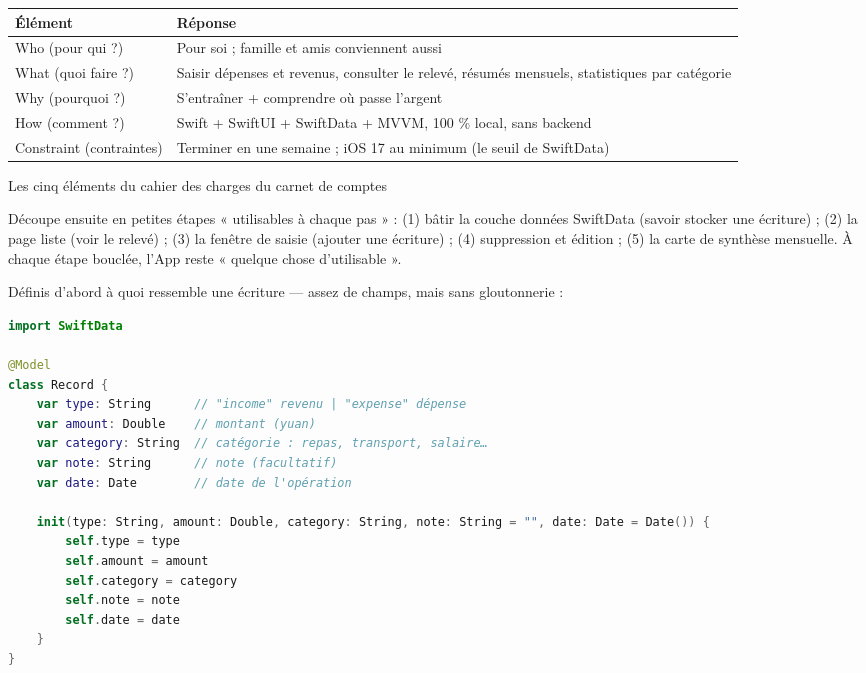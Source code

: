 


\begin{center}
\begin{tabularx}{\linewidth}{|X|X|}
\hline
\textbf{Élément} & \textbf{Réponse} \tabularnewline
\hline
Who (pour qui ?) & Pour soi ; famille et amis conviennent aussi \tabularnewline
What (quoi faire ?) & Saisir dépenses et revenus, consulter le relevé, résumés mensuels, statistiques par catégorie \tabularnewline
Why (pourquoi ?) & S'entraîner + comprendre où passe l'argent \tabularnewline
How (comment ?) & Swift + SwiftUI + SwiftData + MVVM, 100 \% local, sans backend \tabularnewline
Constraint (contraintes) & Terminer en une semaine ; iOS 17 au minimum (le seuil de SwiftData) \tabularnewline
\hline
\end{tabularx}
\end{center}

\begin{center}\small\color{gray}Les cinq éléments du cahier des charges du carnet de comptes\end{center}

Découpe ensuite en petites étapes « utilisables à chaque pas » : (1) bâtir la couche données SwiftData (savoir stocker une écriture) ; (2) la page liste (voir le relevé) ; (3) la fenêtre de saisie (ajouter une écriture) ; (4) suppression et édition ; (5) la carte de synthèse mensuelle. À chaque étape bouclée, l'App reste « quelque chose d'utilisable ».


Définis d'abord à quoi ressemble une écriture — assez de champs, mais sans gloutonnerie :

\begin{lstlisting}[language=Swift]
import SwiftData

@Model
class Record {
    var type: String      // "income" revenu | "expense" dépense
    var amount: Double    // montant (yuan)
    var category: String  // catégorie : repas, transport, salaire…
    var note: String      // note (facultatif)
    var date: Date        // date de l'opération

    init(type: String, amount: Double, category: String, note: String = "", date: Date = Date()) {
        self.type = type
        self.amount = amount
        self.category = category
        self.note = note
        self.date = date
    }
}
\end{lstlisting}

